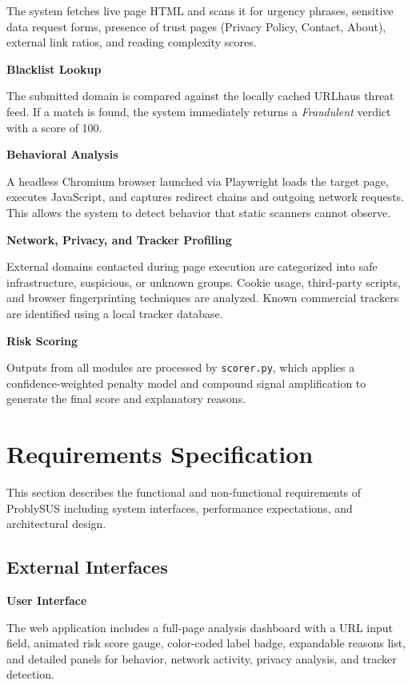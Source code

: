 The system fetches live page HTML and scans it for urgency phrases, sensitive data request forms, presence of trust pages (Privacy Policy, Contact, About), external link ratios, and reading complexity scores.

\textbf{Blacklist Lookup}

The submitted domain is compared against the locally cached URLhaus threat feed. If a match is found, the system immediately returns a \textit{Fraudulent} verdict with a score of 100.

\textbf{Behavioral Analysis}

A headless Chromium browser launched via Playwright loads the target page, executes JavaScript, and captures redirect chains and outgoing network requests. This allows the system to detect behavior that static scanners cannot observe.

\textbf{Network, Privacy, and Tracker Profiling}

External domains contacted during page execution are categorized into safe infrastructure, suspicious, or unknown groups. Cookie usage, third-party scripts, and browser fingerprinting techniques are analyzed. Known commercial trackers are identified using a local tracker database.

\textbf{Risk Scoring}

Outputs from all modules are processed by \texttt{scorer.py}, which applies a confidence-weighted penalty model and compound signal amplification to generate the final score and explanatory reasons.

\section{Requirements Specification}

This section describes the functional and non-functional requirements of ProblySUS including system interfaces, performance expectations, and architectural design.

\subsection{External Interfaces}

\textbf{User Interface}

The web application includes a full-page analysis dashboard with a URL input field, animated risk score gauge, color-coded label badge, expandable reasons list, and detailed panels for behavior, network activity, privacy analysis, and tracker detection.

